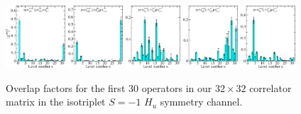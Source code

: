 \begin{figure}[H]
    \includegraphics[width=0.1975\textwidth]{figures/sigmas/hu/zfactors/zfactor_isotriplet_pion_sigma-Hu_1-P000-A1um-SS_0-P000-Hg-SS_0.pdf}
    \includegraphics[width=0.18\textwidth]{figures/sigmas/hu/zfactors/zfactor_isotriplet_pion_sigma-Hu_1-P000-A1um-TDO_1-P000-Hg-SS_0.pdf}
    \includegraphics[width=0.18\textwidth]{figures/sigmas/hu/zfactors/zfactor_isotriplet_pion_sigma-Hu_1-P001-A2m-SS_1-P00-1-G2-SS_0.pdf}
    \includegraphics[width=0.18\textwidth]{figures/sigmas/hu/zfactors/zfactor_isotriplet_pion_sigma-Hu_1-P010-A2m-SS_0-P0-10-G1-SS_0.pdf}
    \includegraphics[width=0.18\textwidth]{figures/sigmas/hu/zfactors/zfactor_isotriplet_pion_sigma-Hu_1-P010-A2m-SS_1-P0-10-G1-SS_0.pdf}
    \caption{Overlap factors for the first 30 operators in our $32\times 32$ correlator matrix in the isotriplet $S=-1$ $H_u$ symmetry channel.}\label{fig:hu_zfactors1}
\end{figure}

